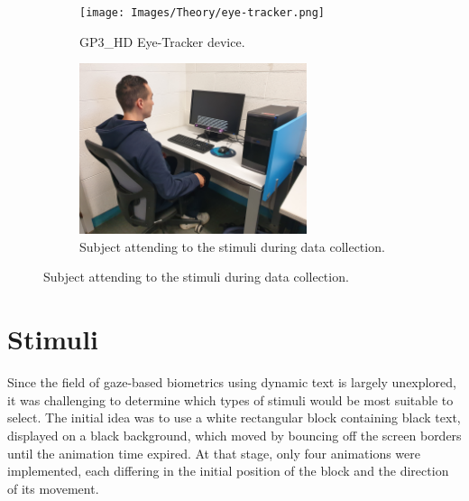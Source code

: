 \documentclass[12pt]{report}
\begin{document}
\begin{figure}[htbp]
    \centering
    \begin{subfigure}[t]{0.45\textwidth}
        \centering
        \texttt{[image: Images/Theory/eye-tracker.png]}
        \caption{GP3\_HD Eye-Tracker device.}
        \label{fig:et}
    \end{subfigure}
    \hfill
    \begin{subfigure}[t]{0.45\textwidth}
        \centering
        \includegraphics[height=5cm]{Images/Theory/sample.jpg} 
        \caption{Subject attending to the stimuli during data collection.}
        \label{fig:sample}
    \end{subfigure}
    \label{fig:et_sample}
\end{figure}


\FloatBarrier

\section{Stimuli}
\label{subsec:stimuli}

Since the field of gaze-based biometrics using dynamic text is largely unexplored, it was challenging to determine which types of stimuli would be most suitable to select.
The initial idea was to use a white rectangular block containing black text, displayed on a black background, which moved by bouncing off the screen borders until the animation time expired.
At that stage, only four animations were implemented, each differing in the initial position of the block and the direction of its movement.
\end{document}
